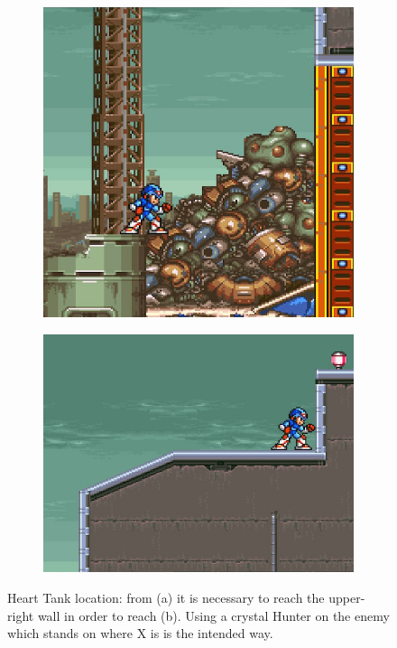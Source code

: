 \begin{figure}[htp]
	\centering
	\begin{subfigure}{0.305\linewidth}
		\centering
		\includegraphics[width=\linewidth]{figures/X2/Morph_moth/Moth_heart_1.jpg}	
		\caption{}
	\end{subfigure}
	\begin{subfigure}{0.4\linewidth}
		\centering
		\includegraphics[width=\linewidth]{figures/X2/Morph_moth/Moth_heart_2.jpg}
		\caption{}	
	\end{subfigure}
	\caption{Heart Tank location: from (a) it is necessary to reach the upper-right wall in order to reach (b). Using a crystal Hunter on the enemy which stands on where X is is the intended way.}
\end{figure}


